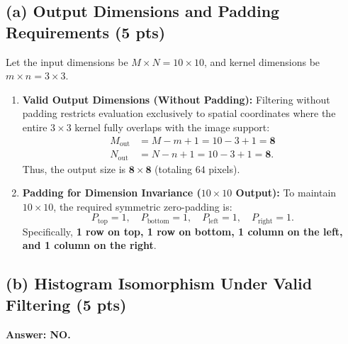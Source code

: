 \documentclass[11pt,a4paper]{article}
\begin{document}
\subsection{(a) Output Dimensions and Padding Requirements (5 pts)}
Let the input dimensions be $M \times N = 10 \times 10$, and kernel dimensions be $m \times n = 3 \times 3$.
\begin{enumerate}
    \item \textbf{Valid Output Dimensions (Without Padding):}
    Filtering without padding restricts evaluation exclusively to spatial coordinates where the entire $3 \times 3$ kernel fully overlaps with the image support:
    \begin{align}
    M_{\text{out}} &= M - m + 1 = 10 - 3 + 1 = \mathbf{8} \\
    N_{\text{out}} &= N - n + 1 = 10 - 3 + 1 = \mathbf{8}.
    \end{align}
    Thus, the output size is $\mathbf{8 \times 8}$ (totaling $64$ pixels).
    \item \textbf{Padding for Dimension Invariance ($10 \times 10$ Output):}
    To maintain $10 \times 10$, the required symmetric zero-padding is:
    \begin{equation}
    P_{\text{top}} = 1, \quad P_{\text{bottom}} = 1, \quad P_{\text{left}} = 1, \quad P_{\text{right}} = 1.
    \end{equation}
    Specifically, \textbf{1 row on top, 1 row on bottom, 1 column on the left, and 1 column on the right}.
\end{enumerate}

\subsection{(b) Histogram Isomorphism Under Valid Filtering (5 pts)}
\noindent\textbf{Answer: NO.}
\end{document}
